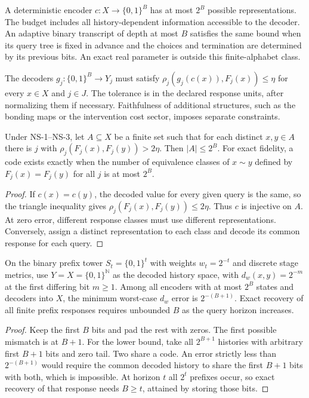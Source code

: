 \begin{assumption}\label{ass:ns2}
A deterministic encoder $c:X\to\{0,1\}^B$ has at most $2^B$ possible representations. The budget includes all history-dependent information accessible to the decoder. An adaptive binary transcript of depth at most $B$ satisfies the same bound when its query tree is fixed in advance and the choices and termination are determined by its previous bits. An exact real parameter is outside this finite-alphabet class.
\end{assumption}

\begin{assumption}\label{ass:ns3}
The decoders $g_j:\{0,1\}^B\to Y_j$ must satisfy $\rho_j(g_j(c(x)),F_j(x))\leq\eta$ for every $x\in X$ and $j\in J$. The tolerance is in the declared response units, after normalizing them if necessary. Faithfulness of additional structures, such as the bonding maps or the intervention cost sector, imposes separate constraints.
\end{assumption}

\begin{theorem}\label{thm:non-simulability}
Under NS-1--NS-3, let $A\subseteq X$ be a finite set such that for each distinct $x,y\in A$ there is $j$ with $\rho_j(F_j(x),F_j(y))>2\eta$. Then $|A|\leq 2^B$. For exact fidelity, a code exists exactly when the number of equivalence classes of $x\sim y$ defined by $F_j(x)=F_j(y)$ for all $j$ is at most $2^B$.
\end{theorem}
\begin{proof}
If $c(x)=c(y)$, the decoded value for every given query is the same, so the triangle inequality gives $\rho_j(F_j(x),F_j(y))\leq 2\eta$. Thus $c$ is injective on $A$. At zero error, different response classes must use different representations. Conversely, assign a distinct representation to each class and decode its common response for each query.
\end{proof}

\begin{theorem}\label{thm:finite-budget-approximation}
On the binary prefix tower $S_t=\{0,1\}^{t}$ with weights $w_t=2^{-t}$ and discrete stage metrics, use $Y=X=\{0,1\}^{\mathbb N}$ as the decoded history space, with $d_w(x,y)=2^{-m}$ at the first differing bit $m\geq1$. Among all encoders with at most $2^B$ states and decoders into $X$, the minimum worst-case $d_w$ error is $2^{-(B+1)}$. Exact recovery of all finite prefix responses requires unbounded $B$ as the query horizon increases.
\end{theorem}
\begin{proof}
Keep the first $B$ bits and pad the rest with zeros. The first possible mismatch is at $B+1$. For the lower bound, take all $2^{B+1}$ histories with arbitrary first $B+1$ bits and zero tail. Two share a code. An error strictly less than $2^{-(B+1)}$ would require the common decoded history to share the first $B+1$ bits with both, which is impossible. At horizon $t$ all $2^t$ prefixes occur, so exact recovery of that response needs $B\geq t$, attained by storing those bits.
\end{proof}


